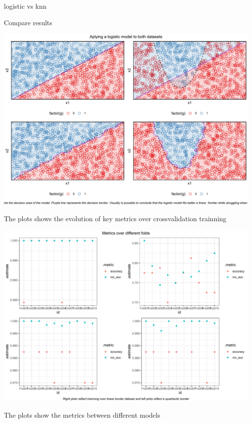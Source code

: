 \documentclass[
  ignorenonframetext,
]{article}
\begin{document}
\begin{frame}[fragile]{logistic vs knn}
\begin{block}{Compare results}
\begin{center}\includegraphics{_main_files/figure-beamer/unnamed-chunk-13-1} \end{center}

The plots shows the evolution of key metrics over crossvalidation trainning

\begin{center}\includegraphics{_main_files/figure-beamer/unnamed-chunk-14-1} \end{center}

The plots show the metrics between different models


\end{block}
\end{frame}
\end{document}
